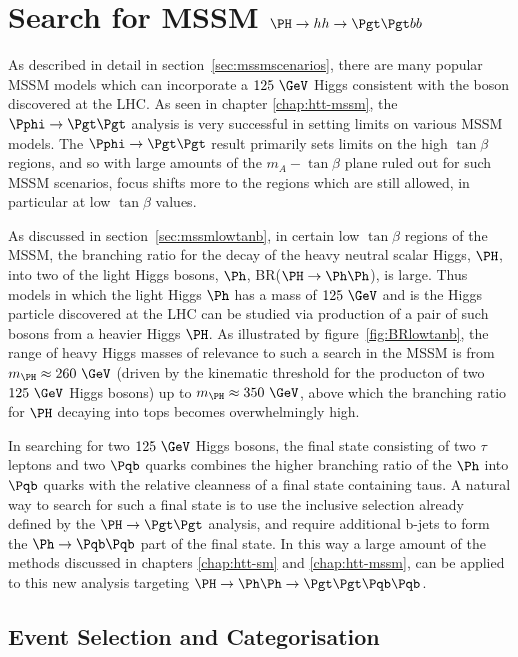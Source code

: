 \chapter{Search for MSSM $\PH \to hh \to \Pgt\Pgt bb$}
\label{chap:Hhh}
\cite{}
As described in detail in section~\ref{sec:mssmscenarios}, there are many popular
\ac{MSSM} models which can incorporate a $125~\GeV$ Higgs consistent with the boson
discovered at the LHC. As seen in chapter \ref{chap:htt-mssm}, the 
$\Pphi \to \Pgt\Pgt$ analysis is very successful in 
setting limits on various \ac{MSSM} models. The $\Pphi \to \Pgt \Pgt$ result primarily sets
limits on the high $\tan\beta$ regions, and so with large amounts of the
$m_{A}-\tan\beta$ plane ruled out for such \ac{MSSM} scenarios, focus shifts more 
to the regions which are still allowed, in particular at low $\tan\beta$ values.

As discussed in section~\ref{sec:mssmlowtanb}, in certain low $\tan\beta$ regions 
of the \ac{MSSM}, the branching ratio for the
decay of the heavy neutral scalar Higgs, $\PH$, into two of the light Higgs
bosons, $\Ph$, BR($\PH \to \Ph\Ph$), is large. Thus models in which the
light Higgs $\Ph$ has a mass of $125~\GeV$ and is the Higgs particle discovered at the
LHC can be studied via production of a pair of such bosons from a
heavier Higgs $\PH$. As illustrated by figure~\ref{fig:BRlowtanb}, the range of heavy 
Higgs masses of relevance to such a search in the \ac{MSSM} is from $m_{\PH}\approx260~\GeV$ 
(driven by the kinematic threshold for the producton of two $125~\GeV$ Higgs
bosons) up to $m_{\PH}\approx350~\GeV$, above which the branching ratio for 
$\PH$ decaying into tops becomes overwhelmingly high.

In searching for two $125~\GeV$ Higgs bosons, the final state consisting of two
$\tau$ leptons and two $\Pqb$ quarks combines the higher branching ratio of the
$\Ph$ into $\Pqb$ quarks with the relative cleanness of a final state containing
taus. A natural way to search for such a final state is to use the inclusive
selection already defined by the $\PH\to\Pgt\Pgt$ analysis, and require
additional b-jets to form the $\Ph\to\Pqb\Pqb$ part of the final state. 
In this way a large amount of the methods discussed in chapters 
\ref{chap:htt-sm} and \ref{chap:htt-mssm}, 
can be applied to this new analysis targeting $\PH \to \Ph\Ph \to \Pgt\Pgt
\Pqb\Pqb$.

\section{Event Selection and Categorisation}
\label{sec:HhhEventSelection}

